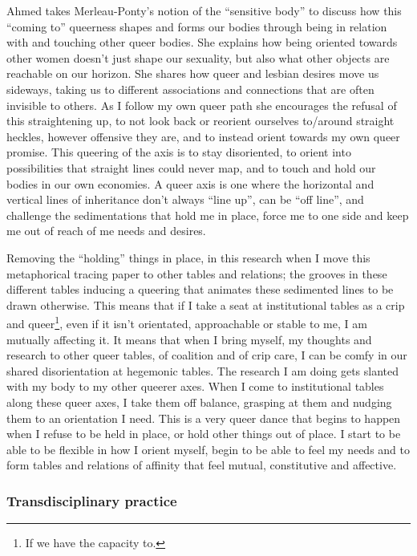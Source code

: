 Ahmed takes Merleau-Ponty's notion of the ``sensitive body'' to discuss
how this ``coming to'' queerness shapes and forms our bodies through
being in relation with and touching other queer bodies. She explains how
being oriented towards other women doesn't just shape our sexuality, but
also what other objects are reachable on our horizon. She shares how
queer and lesbian desires move us sideways, taking us to different
associations and connections that are often invisible to others. As I
follow my own queer path she encourages the refusal of this
straightening up, to not look back or reorient ourselves to/around
straight heckles, however offensive they are, and to instead orient
towards my own queer promise. This queering of the axis is to stay
disoriented, to orient into possibilities that straight lines could
never map, and to touch and hold our bodies in our own economies. A
queer axis is one where the horizontal and vertical lines of inheritance
don't always ``line up'', can be ``off line'', and challenge the
sedimentations that hold me in place, force me to one side and keep me
out of reach of me needs and desires.

Removing the ``holding'' things in place, in this research when I move
this metaphorical tracing paper to other tables and relations; the
grooves in these different tables inducing a queering that animates
these sedimented lines to be drawn otherwise. This means that if I take
a seat at institutional tables as a crip and queer\footnote{If we have
  the capacity to.}, even if it isn't orientated, approachable or stable
to me, I am mutually affecting it. It means that when I bring myself, my
thoughts and research to other queer tables, of coalition and of crip
care, I can be comfy in our shared disorientation at hegemonic tables.
The research I am doing gets slanted with my body to my other queerer
axes. When I come to institutional tables along these queer axes, I take
them off balance, grasping at them and nudging them to an orientation I
need. This is a very queer dance that begins to happen when I refuse to
be held in place, or hold other things out of place. I start to be able
to be flexible in how I orient myself, begin to be able to feel my needs
and to form tables and relations of affinity that feel mutual,
constitutive and affective.

\hypertarget{transdisciplinary-practice}{%
\subsubsection[Transdisciplinary
practice]{\texorpdfstring{\protect\hypertarget{anchor}{}{}Transdisciplinary
practice}{Transdisciplinary practice}}\label{transdisciplinary-practice}}

